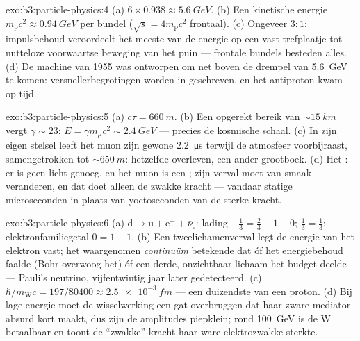 \begin{solution}{exo:b3:particle-physics:4}
(a) $6\times0.938 \approx \qty{5.6}{GeV}$. (b) Een kinetische energie
$m_{\text{p}}c^2 \approx \qty{0.94}{GeV}$ per bundel
($\sqrt s = 4m_{\text{p}}c^2$ frontaal). (c) Ongeveer $3:1$:
impulsbehoud veroordeelt het meeste van de energie op een vast trefplaatje tot
nutteloze voorwaartse beweging van het puin --- frontale bundels besteden
alles. (d) De machine van 1955 was ontworpen om net boven de
drempel van \qty{5.6}{GeV} te komen: versnellerbegrotingen worden in
 geschreven, en het antiproton kwam op tijd.
\end{solution}

\begin{solution}{exo:b3:particle-physics:5}
(a) $c\tau = \qty{660}{m}$. (b) Een opgerekt bereik van
${\sim}\qty{15}{km}$ vergt $\gamma \sim 23$: $E = \gamma
m_\mu c^2 \sim \qty{2.4}{GeV}$ --- precies de kosmische schaal. (c)
In zijn eigen stelsel leeft het muon zijn gewone \qty{2.2}{\micro s}
terwijl de atmosfeer voorbijraast, samengetrokken tot
${\sim}\qty{650}{m}$: hetzelfde overleven, een ander grootboek. (d) Het :
er is geen  licht genoeg, en het muon is een
; zijn verval moet van smaak veranderen, en dat doet alleen de zwakke kracht
--- vandaar statige microseconden in plaats van yoctoseconden van de sterke kracht.
\end{solution}

\begin{solution}{exo:b3:particle-physics:6}
(a) $\text{d} \to \text{u} + \text{e}^- + \bar\nu_{\text{e}}$:
lading $-\tfrac13 = \tfrac23 - 1 + 0$; 
$\tfrac13 = \tfrac13$; elektronfamiliegetal $0 = 1 - 1$. (b) Een
tweelichamenverval legt de energie van het elektron vast; het waargenomen
\emph{continuüm} betekende dat óf het energiebehoud faalde
(Bohr overwoog het) óf een derde, onzichtbaar lichaam het
budget deelde --- Pauli's neutrino, vijfentwintig jaar later gedetecteerd.
(c) $\hbar/m_{\text{W}}c = 197/80400 \approx
\qty{2.5e-3}{fm}$ --- een duizendste van een proton. (d) Bij lage
energie moet de wisselwerking een gat overbruggen dat haar zware mediator
absurd kort maakt, dus zijn de amplitudes piepklein; rond
\qty{100}{GeV} is de W betaalbaar en toont de ``zwakke'' kracht
haar ware elektrozwakke sterkte.
\end{solution}

